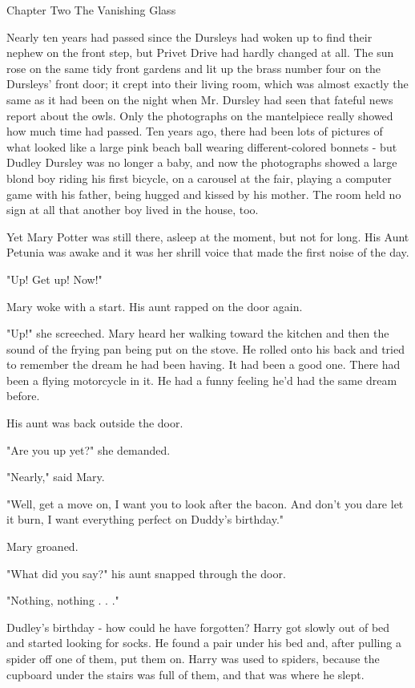 Chapter Two
The Vanishing Glass

Nearly ten years had passed since the Dursleys had woken up to find their nephew on the front step, but Privet Drive had hardly changed at all. The sun rose on the same tidy front gardens and lit up the brass number four on the Dursleys' front door; it crept into their living room, which was almost exactly the same as it had been on the night when Mr. Dursley had seen that fateful news report about the owls. Only the photographs on the mantelpiece really showed how much time had passed. Ten years ago, there had been lots of pictures of what looked like a large pink beach ball wearing different-colored bonnets - but Dudley Dursley was no longer a baby, and now the photographs showed a large blond boy riding his first bicycle, on a carousel at the fair, playing a computer game with his father, being hugged and kissed by his mother. The room held no sign at all that another boy lived in the house, too. 

Yet Mary Potter was still there, asleep at the moment, but not for long. His Aunt Petunia was awake and it was her shrill voice that made the first noise of the day. 

"Up! Get up! Now!" 

Mary woke with a start. His aunt rapped on the door again. 

"Up!" she screeched. Mary heard her walking toward the kitchen and then the sound of the frying pan being put on the stove. He rolled onto his back and tried to remember the dream he had been having. It had been a good one. There had been a flying motorcycle in it. He had a funny feeling he'd had the same dream before. 

His aunt was back outside the door. 

"Are you up yet?" she demanded. 

"Nearly," said Mary. 

"Well, get a move on, I want you to look after the bacon. And don't you dare let it burn, I want everything perfect on Duddy's birthday." 

Mary groaned. 

"What did you say?" his aunt snapped through the door. 

"Nothing, nothing . . ." 

Dudley's birthday - how could he have forgotten? Harry got slowly out of bed and started looking for socks. He found a pair under his bed and, after pulling a spider off one of them, put them on. Harry was used to spiders, because the cupboard under the stairs was full of them, and that was where he slept. 

